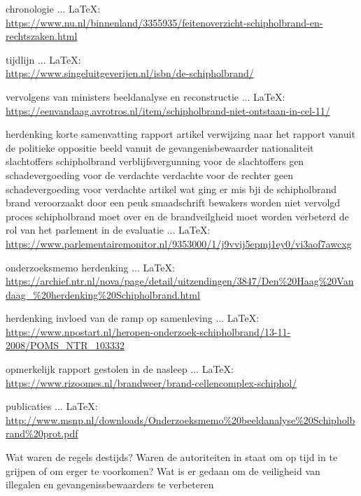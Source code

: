 {{chronologie
 ... \LaTeX:\\ \url{https://www.nu.nl/binnenland/3355935/feitenoverzicht-schipholbrand-en-rechtszaken.html}

tijdlijn
 ... \LaTeX:\\ \url{https://www.singeluitgeverijen.nl/isbn/de-schipholbrand/}

vervolgens van ministers
beeldanalyse en reconstructie
 ... \LaTeX:\\ \url{https://eenvandaag.avrotros.nl/item/schipholbrand-niet-ontstaan-in-cel-11/}

herdenking
korte samenvatting
rapport
artikel
verwijzing naar het rapport vanuit de politieke oppositie
beeld vanuit de gevangenisbewaarder
nationaliteit slachtoffers schipholbrand
verblijfsvergunning voor de slachtoffers
gen schadevergoeding voor de verdachte
verdachte voor de rechter
geen schadevergoeding voor verdachte
artikel wat ging er mis bji de schipholbrand
brand veroorzaakt door een peuk
smaadschrift
bewakers worden niet vervolgd
proces schipholbrand moet over en de brandveilgheid moet worden verbeterd
de rol van het parlement in de evaluatie
 ... \LaTeX:\\ \url{https://www.parlementairemonitor.nl/9353000/1/j9vvij5epmj1ey0/vi3aof7awcxg}

onderzoeksmemo
herdenking
 ... \LaTeX:\\ \url{https://archief.ntr.nl/nova/page/detail/uitzendingen/3847/Den%20Haag%20Vandaag_%20herdenking%20Schipholbrand.html}

herdenking
invloed van de ramp op samenleving
 ... \LaTeX:\\ \url{https://www.npostart.nl/heropen-onderzoek-schipholbrand/13-11-2008/POMS_NTR_103332}

opmerkelijk rapport gestolen in de nasleep
 ... \LaTeX:\\ \url{https://www.rizoomes.nl/brandweer/brand-cellencomplex-schiphol/}



publicaties
 ... \LaTeX:\\ \url{http://www.msnp.nl/downloads/Onderzoeksmemo%20beeldanalyse%20Schipholbrand%20prot.pdf}

Wat waren de regels destijds?
Waren de autoriteiten in staat om op tijd in te grijpen of om erger te voorkomen?
Wat is er gedaan om de veiligheid van illegalen en gevangenissbewaarders te verbeteren

}}
